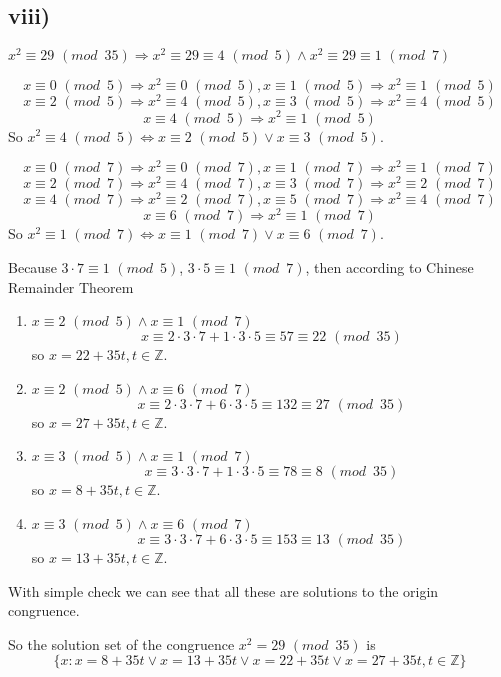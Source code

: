 \documentclass[a4paper,12pt,titlepage]{article}
\begin{document}
\subsection*{viii)}
$x^2\equiv29\,\,(mod\,\,\,35)\Rightarrow x^2\equiv29\equiv4\,\,(mod\,\,\,5)\wedge x^2\equiv29\equiv1\,\,(mod\,\,\,7)$

$$x\equiv 0\,\,(mod\,\,\,5)\Rightarrow x^2\equiv 0\,\,(mod\,\,\,5),x\equiv 1\,\,(mod\,\,\,5)\Rightarrow x^2\equiv 1\,\,(mod\,\,\,5)$$
$$x\equiv 2\,\,(mod\,\,\,5)\Rightarrow x^2\equiv 4\,\,(mod\,\,\,5),x\equiv 3\,\,(mod\,\,\,5)\Rightarrow x^2\equiv 4\,\,(mod\,\,\,5)$$
$$x\equiv 4\,\,(mod\,\,\,5)\Rightarrow x^2\equiv 1\,\,(mod\,\,\,5)$$
So $x^2\equiv4\,\,(mod\,\,\,5)\Leftrightarrow x\equiv 2\,\,(mod\,\,\,5)\vee x\equiv 3\,\,(mod\,\,\,5)$.

$$x\equiv 0\,\,(mod\,\,\,7)\Rightarrow x^2\equiv 0\,\,(mod\,\,\,7),x\equiv 1\,\,(mod\,\,\,7)\Rightarrow x^2\equiv 1\,\,(mod\,\,\,7)$$
$$x\equiv 2\,\,(mod\,\,\,7)\Rightarrow x^2\equiv 4\,\,(mod\,\,\,7),x\equiv 3\,\,(mod\,\,\,7)\Rightarrow x^2\equiv 2\,\,(mod\,\,\,7)$$
$$x\equiv 4\,\,(mod\,\,\,7)\Rightarrow x^2\equiv 2\,\,(mod\,\,\,7),x\equiv 5\,\,(mod\,\,\,7)\Rightarrow x^2\equiv 4\,\,(mod\,\,\,7)$$
$$x\equiv 6\,\,(mod\,\,\,7)\Rightarrow x^2\equiv 1\,\,(mod\,\,\,7)$$
So $x^2\equiv1\,\,(mod\,\,\,7)\Leftrightarrow x\equiv 1\,\,(mod\,\,\,7)\vee x\equiv 6\,\,(mod\,\,\,7)$.

Because $3\cdot7\equiv1\,\,(mod \,\,\,5)$, $3\cdot5\equiv1\,\,(mod\,\,\,7)$, then according to Chinese Remainder Theorem
\begin{enumerate}

\item $x\equiv 2\,\,(mod\,\,\,5)\wedge x\equiv 1\,\,(mod\,\,\,7)$
$$x\equiv2\cdot 3\cdot 7+1\cdot 3\cdot 5\equiv57\equiv22\,\,(mod\,\,\,35)$$
so $x=22+35t,t\in\mathbb{Z}.$

\item $x\equiv 2\,\,(mod\,\,\,5)\wedge x\equiv 6\,\,(mod\,\,\,7)$
$$x\equiv2\cdot 3\cdot 7+6\cdot 3\cdot 5\equiv132\equiv27\,\,(mod\,\,\,35)$$
so $x=27+35t,t\in\mathbb{Z}.$

\item $x\equiv 3\,\,(mod\,\,\,5)\wedge x\equiv 1\,\,(mod\,\,\,7)$
$$x\equiv3\cdot 3\cdot 7+1\cdot 3\cdot 5\equiv78\equiv8\,\,(mod\,\,\,35)$$
so $x=8+35t,t\in\mathbb{Z}.$

\item $x\equiv 3\,\,(mod\,\,\,5)\wedge x\equiv 6\,\,(mod\,\,\,7)$
$$x\equiv3\cdot 3\cdot 7+6\cdot 3\cdot 5\equiv153\equiv13\,\,(mod\,\,\,35)$$
so $x=13+35t,t\in\mathbb{Z}.$




\end{enumerate}
With simple check we can see that all these are solutions to the origin congruence.

So the solution set of the congruence $x^2 = 29 \,\,(mod\,\,\,35)$ is
$$\lbrace x:x=8+35t\vee x=13+35t\vee x=22+35t\vee x=27+35t,t\in\mathbb{Z}\rbrace$$
\end{document}
